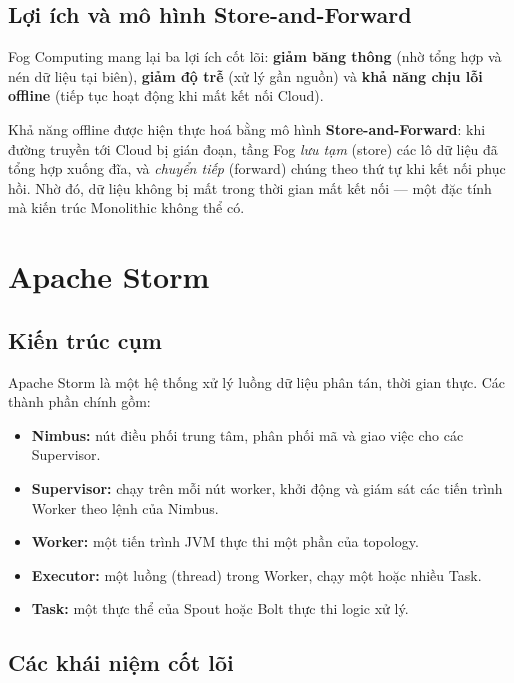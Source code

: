 \documentclass[13pt,a4paper]{report}
\begin{document}
\subsection{Lợi ích và mô hình Store-and-Forward}

Fog Computing mang lại ba lợi ích cốt lõi: \textbf{giảm băng thông} (nhờ tổng hợp
và nén dữ liệu tại biên), \textbf{giảm độ trễ} (xử lý gần nguồn) và \textbf{khả
năng chịu lỗi offline} (tiếp tục hoạt động khi mất kết nối Cloud).

Khả năng offline được hiện thực hoá bằng mô hình \textbf{Store-and-Forward}: khi
đường truyền tới Cloud bị gián đoạn, tầng Fog \textit{lưu tạm} (store) các lô dữ
liệu đã tổng hợp xuống đĩa, và \textit{chuyển tiếp} (forward) chúng theo thứ tự
khi kết nối phục hồi. Nhờ đó, dữ liệu không bị mất trong thời gian mất kết nối ---
một đặc tính mà kiến trúc Monolithic không thể có.

\section{Apache Storm}

\subsection{Kiến trúc cụm}

Apache Storm là một hệ thống xử lý luồng dữ liệu phân tán, thời gian thực. Các
thành phần chính gồm:

\begin{itemize}
  \item \textbf{Nimbus:} nút điều phối trung tâm, phân phối mã và giao việc cho
        các Supervisor.
  \item \textbf{Supervisor:} chạy trên mỗi nút worker, khởi động và giám sát các
        tiến trình Worker theo lệnh của Nimbus.
  \item \textbf{Worker:} một tiến trình JVM thực thi một phần của topology.
  \item \textbf{Executor:} một luồng (thread) trong Worker, chạy một hoặc nhiều
        Task.
  \item \textbf{Task:} một thực thể của Spout hoặc Bolt thực thi logic xử lý.
\end{itemize}

\subsection{Các khái niệm cốt lõi}
\end{document}
